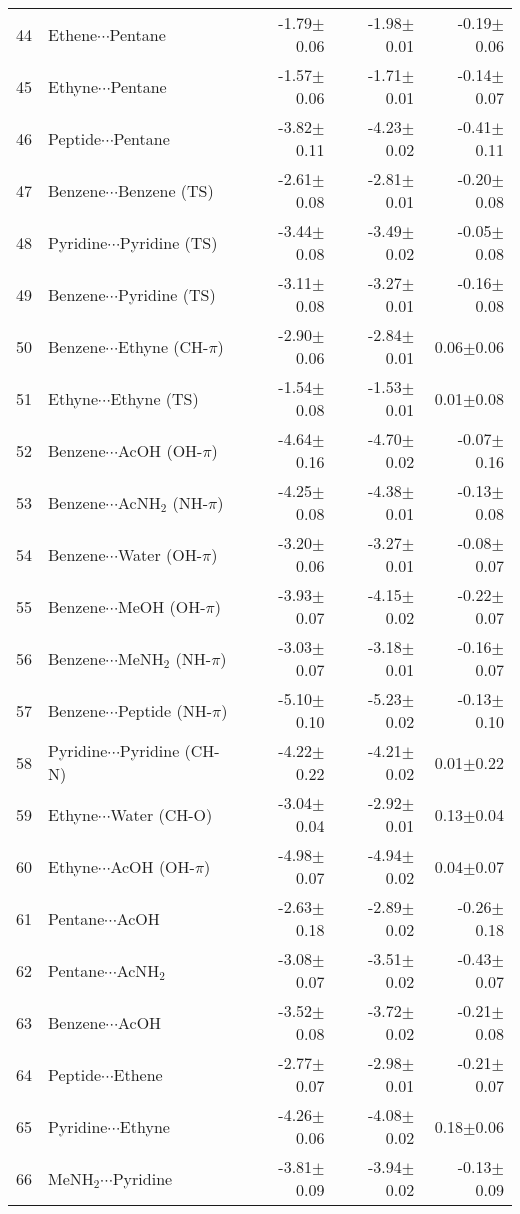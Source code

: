 \begin{longtable}{llrrr}
44 & Ethene$\cdots$Pentane & -1.79$\pm$0.06 & -1.98$\pm$0.01 & -0.19$\pm$0.06  \\
45 & Ethyne$\cdots$Pentane & -1.57$\pm$0.06 & -1.71$\pm$0.01 & -0.14$\pm$0.07  \\
46 & Peptide$\cdots$Pentane & -3.82$\pm$0.11 & -4.23$\pm$0.02 & -0.41$\pm$0.11  \\
47 & Benzene$\cdots$Benzene (TS) & -2.61$\pm$0.08 & -2.81$\pm$0.01 & -0.20$\pm$0.08  \\
48 & Pyridine$\cdots$Pyridine (TS) & -3.44$\pm$0.08 & -3.49$\pm$0.02 & -0.05$\pm$0.08  \\
49 & Benzene$\cdots$Pyridine (TS) & -3.11$\pm$0.08 & -3.27$\pm$0.01 & -0.16$\pm$0.08  \\
50 & Benzene$\cdots$Ethyne (CH-$\pi$) & -2.90$\pm$0.06 & -2.84$\pm$0.01 & 0.06$\pm$0.06  \\
51 & Ethyne$\cdots$Ethyne (TS) & -1.54$\pm$0.08 & -1.53$\pm$0.01 & 0.01$\pm$0.08  \\
52 & Benzene$\cdots$AcOH (OH-$\pi$) & -4.64$\pm$0.16 & -4.70$\pm$0.02 & -0.07$\pm$0.16  \\
53 & Benzene$\cdots$AcNH$_2$ (NH-$\pi$) & -4.25$\pm$0.08 & -4.38$\pm$0.01 & -0.13$\pm$0.08  \\
54 & Benzene$\cdots$Water (OH-$\pi$) & -3.20$\pm$0.06 & -3.27$\pm$0.01 & -0.08$\pm$0.07  \\
55 & Benzene$\cdots$MeOH (OH-$\pi$) & -3.93$\pm$0.07 & -4.15$\pm$0.02 & -0.22$\pm$0.07  \\
56 & Benzene$\cdots$MeNH$_2$ (NH-$\pi$) & -3.03$\pm$0.07 & -3.18$\pm$0.01 & -0.16$\pm$0.07  \\
57 & Benzene$\cdots$Peptide (NH-$\pi$) & -5.10$\pm$0.10 & -5.23$\pm$0.02 & -0.13$\pm$0.10  \\
58 & Pyridine$\cdots$Pyridine (CH-N) & -4.22$\pm$0.22 & -4.21$\pm$0.02 & 0.01$\pm$0.22  \\
59 & Ethyne$\cdots$Water (CH-O) & -3.04$\pm$0.04 & -2.92$\pm$0.01 & 0.13$\pm$0.04  \\
60 & Ethyne$\cdots$AcOH (OH-$\pi$) & -4.98$\pm$0.07 & -4.94$\pm$0.02 & 0.04$\pm$0.07  \\
61 & Pentane$\cdots$AcOH & -2.63$\pm$0.18 & -2.89$\pm$0.02 & -0.26$\pm$0.18  \\
62 & Pentane$\cdots$AcNH$_2$ & -3.08$\pm$0.07 & -3.51$\pm$0.02 & -0.43$\pm$0.07  \\
63 & Benzene$\cdots$AcOH & -3.52$\pm$0.08 & -3.72$\pm$0.02 & -0.21$\pm$0.08  \\
64 & Peptide$\cdots$Ethene & -2.77$\pm$0.07 & -2.98$\pm$0.01 & -0.21$\pm$0.07  \\
65 & Pyridine$\cdots$Ethyne & -4.26$\pm$0.06 & -4.08$\pm$0.02 & 0.18$\pm$0.06  \\
66 & MeNH$_2$$\cdots$Pyridine & -3.81$\pm$0.09 & -3.94$\pm$0.02 & -0.13$\pm$0.09  \\
\end{longtable}\normalsize